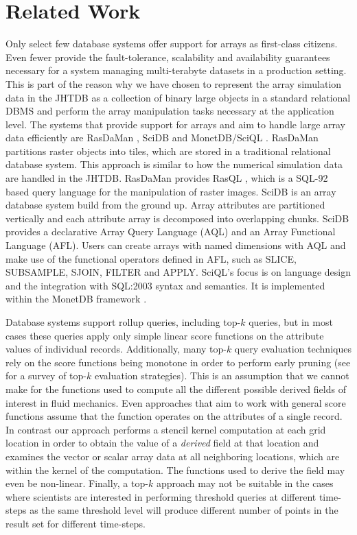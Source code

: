 \documentclass{sig-alternate}
\begin{document}
\section{Related Work}
Only select few database systems offer support for arrays as first-class citizens. Even fewer provide the fault-tolerance, scalability and availability guarantees 
necessary for a system managing multi-terabyte datasets in a production setting. This is part of the reason why we have chosen to represent the array simulation
data in the JHTDB as a collection of binary large objects in a standard relational DBMS and perform the array manipulation tasks necessary at the application level.
The systems that provide
support for arrays and aim to handle large array data efficiently are RasDaMan \cite{Rasdaman}, SciDB \cite{Scidb} and MonetDB/SciQL \cite{Sciql}. RasDaMan
partitions raster objects into tiles, which are stored in a traditional relational database system. This approach is similar to how the numerical simulation data
are handled in the JHTDB. RasDaMan provides RasQL \cite{Rasql}, which is a SQL-92 based query language for the manipulation of raster images. SciDB
is an array database system build from the ground up. Array attributes are partitioned vertically and each attribute array is decomposed into overlapping
chunks. SciDB provides a declarative Array Query Language (AQL) and an Array Functional Language (AFL). Users can create arrays with named
dimensions with AQL and make use of the functional operators defined in AFL, such
as SLICE, SUBSAMPLE, SJOIN, FILTER and APPLY. SciQL's focus is on language design and the integration with SQL:2003 syntax and semantics. It is implemented
within the MonetDB framework \cite{MonetDB}.

Database systems support rollup queries, including top-$k$ queries, but in most cases these
queries apply only simple linear score functions on the attribute values of individual records.
Additionally, many top-$k$ query evaluation techniques rely on the score functions being monotone in order to perform early pruning (see \cite{Ilyas} for a
survey of top-$k$ evaluation strategies).
This is an assumption that we cannot make for the functions used to compute all the different possible derived fields of interest in fluid mechanics.
Even approaches that aim to work with general score functions \cite{Deshpande, Xin} assume that the function operates on the attributes of a single record.
In contrast our approach performs a stencil kernel computation at each grid location in order to obtain the value of a \emph{derived} field at that location and
examines the vector or scalar array data at all neighboring locations, which
are within the kernel of the computation. The functions used to derive the field may even be non-linear.
Finally, a top-$k$ approach may not be suitable in the cases where scientists are interested in performing threshold queries at different time-steps as the
same threshold level will produce different number of points in the result set for different time-steps.
\end{document}
